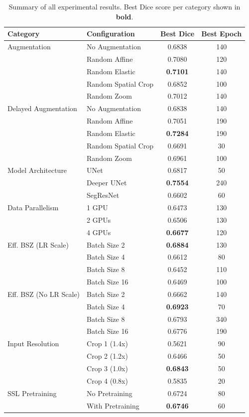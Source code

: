 \begin{table}[htbp]
\centering
\caption{Summary of all experimental results. Best Dice score per category shown in \textbf{bold}.}
\label{tab:summary}
\small
\begin{tabular}{llcc}
\toprule
\textbf{Category} & \textbf{Configuration} & \textbf{Best Dice} & \textbf{Best Epoch} \\
\midrule
Augmentation & No Augmentation & 0.6838 & 140 \\
 & Random Affine & 0.7080 & 120 \\
 & Random Elastic & \textbf{0.7101} & 140 \\
 & Random Spatial Crop & 0.6852 & 100 \\
 & Random Zoom & 0.7012 & 140 \\
\midrule
Delayed Augmentation & No Augmentation & 0.6838 & 140 \\
 & Random Affine & 0.7051 & 190 \\
 & Random Elastic & \textbf{0.7284} & 190 \\
 & Random Spatial Crop & 0.6691 & 30 \\
 & Random Zoom & 0.6961 & 100 \\
\midrule
Model Architecture & UNet & 0.6817 & 50 \\
 & Deeper UNet & \textbf{0.7554} & 240 \\
 & SegResNet & 0.6602 & 60 \\
\midrule
Data Parallelism & 1 GPU & 0.6473 & 130 \\
 & 2 GPUs & 0.6506 & 130 \\
 & 4 GPUs & \textbf{0.6677} & 120 \\
\midrule
Eff. BSZ (LR Scale) & Batch Size 2 & \textbf{0.6884} & 130 \\
 & Batch Size 4 & 0.6612 & 80 \\
 & Batch Size 8 & 0.6452 & 110 \\
 & Batch Size 16 & 0.6469 & 100 \\
\midrule
Eff. BSZ (No LR Scale) & Batch Size 2 & 0.6662 & 140 \\
 & Batch Size 4 & \textbf{0.6923} & 70 \\
 & Batch Size 8 & 0.6793 & 340 \\
 & Batch Size 16 & 0.6776 & 190 \\
\midrule
Input Resolution & Crop 1 (1.4x) & 0.5621 & 90 \\
 & Crop 2 (1.2x) & 0.6466 & 50 \\
 & Crop 3 (1.0x) & \textbf{0.6843} & 50 \\
 & Crop 4 (0.8x) & 0.5835 & 20 \\
\midrule
SSL Pretraining & No Pretraining & 0.6724 & 80 \\
 & With Pretraining & \textbf{0.6746} & 60 \\
\bottomrule
\end{tabular}
\end{table}